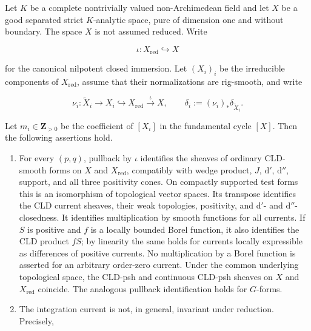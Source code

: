 
\begin{proposition}
\label{prop:p21p3-curve-rigidity-nonreduced}
Let \(K\) be a complete
nontrivially valued non-Archimedean field and let \(X\) be a good separated
strict \(K\)-analytic space, pure of dimension one and without boundary.
The space \(X\) is not assumed reduced.  Write

\[
             \iota:X_{\mathrm{red}}\hookrightarrow X
\]

for the canonical nilpotent closed immersion.  Let \((X_i)_i\) be the
irreducible components of \(X_{\mathrm{red}}\), assume that their
normalizations are rig-smooth, and write

\[
 \nu_i:\widetilde X_i\longrightarrow X_i
       \hookrightarrow X_{\mathrm{red}}\xrightarrow{\iota}X,
 \qquad
 \delta_i:=(\nu_i)_*\delta_{\widetilde X_i}.
\]

Let \(m_i\in\mathbf Z_{>0}\) be the coefficient of \([X_i]\) in the
fundamental cycle \([X]\).  Then the following assertions hold.

\begin{enumerate}
\item\label{itm:p21p3-nr:calculus}
For every \((p,q)\), pullback by \(\iota\) identifies the sheaves of
ordinary CLD-smooth forms on \(X\) and \(X_{\mathrm{red}}\), compatibly
with wedge product, \(J\), \(\mathrm d'\), \(\mathrm d''\), support, and all
three positivity cones.  On compactly supported test forms this is an
isomorphism of topological vector spaces.  Its transpose identifies the
CLD current sheaves, their weak topologies, positivity, and
\(\mathrm d'\)- and \(\mathrm d''\)-closedness.  It identifies multiplication
by smooth functions for all currents.  If \(S\) is positive and \(f\) is a
locally bounded Borel function, it also identifies the CLD product \(fS\);
by linearity the same holds for currents locally expressible as differences
of positive currents.  No multiplication by a Borel function is asserted
for an arbitrary order-zero current.  Under the common underlying
topological space, the CLD-psh and continuous CLD-psh sheaves on \(X\) and
\(X_{\mathrm{red}}\) coincide.  The analogous pullback identification
holds for \(G\)-forms.

\item\label{itm:p21p3-nr:integration}
The integration current is not, in general, invariant under reduction.
Precisely,


\end{enumerate}
\end{proposition}
